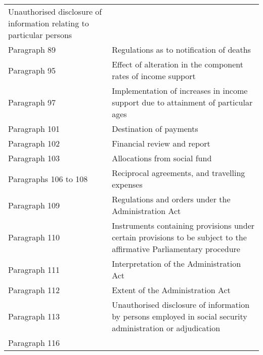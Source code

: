 \documentclass[12pt,a4paper]{article}
\begin{document}
{\begin{longtable}{p{183pt}p{183pt}}
	Unauthorised disclosure of information relating to particular persons\\
\hspace{1em}
    Paragraph 89 &

	Regulations as to notification of deaths\\
\hspace{1em}
    Paragraph 95 &

	Effect of alteration in the component rates of income support\\
\hspace{1em}
    Paragraph 97 &

	Implementation of increases in income support due to attainment of particular ages\\
\hspace{1em}
    Paragraph 101 &

	Destination of payments\\
\hspace{1em}
    Paragraph 102 &

	Financial review and report\\
\hspace{1em}
    Paragraph 103 &

	Allocations from social fund\\
\hspace{1em}
    Paragraphs 106 to 108 &

	Reciprocal agreements, and travelling expenses\\
\hspace{1em}
    Paragraph 109 &

	Regulations and orders under the Administration Act\\
\hspace{1em}
    Paragraph 110 &

	Instruments containing provisions under certain provisions to be subject to the affirmative Parliamentary procedure\\
\hspace{1em}
    Paragraph 111 &

	Interpretation of the Administration Act\\
\hspace{1em}
    Paragraph 112 &

	Extent of the Administration Act\\
\hspace{1em}
    Paragraph 113 &

	Unauthorised disclosure of information by persons employed in social security administration or adjudication\\
\hspace{1em}
    Paragraph 116 &


\end{longtable}}
\end{document}
